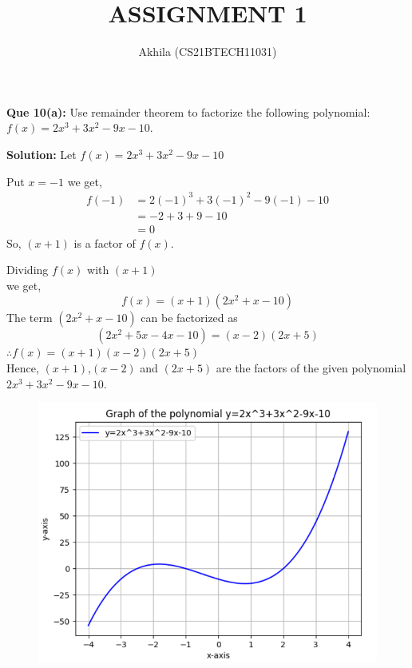 \documentclass[12pt,twocolumn]{article}
\begin{document}
\large \title{ASSIGNMENT 1}
\author{Akhila (CS21BTECH11031)}
\maketitle
{\Large \textbf  {Que 10(a): }}
Use remainder theorem to factorize the following polynomial:\\
$f(x)=2x^3+3x^2-9x-10$.\\
\vspace{2mm}

{\Large \textbf  {Solution:}}
Let $f(x)=2x^3+3x^2-9x-10$ 

Put $x=-1$ we get,
\begin{align*}
f(-1) & =2(-1)^3+3(-1)^2-9(-1)-10\\
      & =-2+3+9-10\\ 
      & =0
\end{align*}
So, $(x+1)$ is a factor of $f(x)$.

Dividing $f(x)$ with $(x+1)$\\ 
 we get,
\begin{equation*}
    f(x)=(x+1)(2x^2+x-10)
\end{equation*}
The term $(2x^2+x-10)$ can be factorized as
\begin{equation*}
    (2x^2+5x-4x-10)=(x-2)(2x+5)
\end{equation*}
\vspace{5mm}
$\therefore f(x)=(x+1)(x-2)(2x+5)$\\
Hence,  $(x+1)$,$(x-2)$ and $(2x+5)$  are the factors of the given polynomial\\
$2x^3+3x^2-9x-10$.
\begin{figure}
\centering
    \includegraphics[scale=0.5]{plot.png}
\end{figure}
\end{document}
